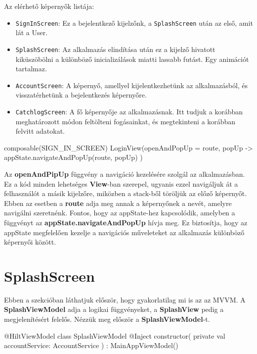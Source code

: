 Az elérhető képernyők listája:
\begin{itemize}
    \item  \texttt{SignInScreen}: Ez a bejelentkező kijelzőnk, a \texttt{SplashScreen} után az első, amit lát a User.
    \item  \texttt{SplashScreen}: Az alkalmazás elindítása után ez a kijelző hivatott kiküszöbölni a különböző inicializálások miatti lassabb futást. Egy animációt tartalmaz.
    \item  \texttt{AccountScreen}: A képernyő, amellyel kijelentkezhetünk az alkalmazásból, és visszatérhetünk a bejelentkezés képernyőre.
    \item  \texttt{CatchlogScreen}: A fő képernyője az alkalmazásnak. Itt tudjuk a korábban meghatározott módon feltölteni fogásainkat, és megtekinteni a korábban felvitt adatokat.
\end{itemize}

\begin{java}[caption = {Az egyik elérhető képernyő.}]
composable(SIGN_IN_SCREEN) {
    LoginView(openAndPopUp = {
    route, popUp -> appState.navigateAndPopUp(route, popUp) })
}
\end{java}

Az \textbf{openAndPipUp} függvény a navigáció kezelésére szolgál az alkalmazásban.
Ez a kód minden lehetséges \textbf{View}-ban szerepel, ugyanis ezzel navigáljuk át a felhasználót a másik kijelzőre, miközben a stack-ből töröljük az előző képernyőt.
Ebben az esetben a \textbf{route} adja meg annak a képernyőnek a nevét, amelyre navigálni szeretnénk.
Fontos, hogy az appState-hez kapcsolódik, amelyben a függvényt az 
\newline
\textbf{appState.navigateAndPopUp} hívja meg. Ez biztosítja, hogy az appState megfelelően kezelje a navigációs műveleteket az alkalmazás különböző képernyői között.

\newpage

\section{SplashScreen}

Ebben a szekcióban láthatjuk először, hogy gyakorlatilag mi is az az MVVM. A \textbf{SplashViewModel} adja a logikai függvényeket, a \textbf{SplashView} pedig a megjelenítésért felelős.
Nézzük meg először a \textbf{SplashViewModel}-t.

\begin{java}[caption = {A SplashViewModel annotációja, és osztály definíciója}]
@HiltViewModel
class SplashViewModel @Inject constructor(
    private val accountService: AccountService
) : MainAppViewModel() {

}
\end{java}

